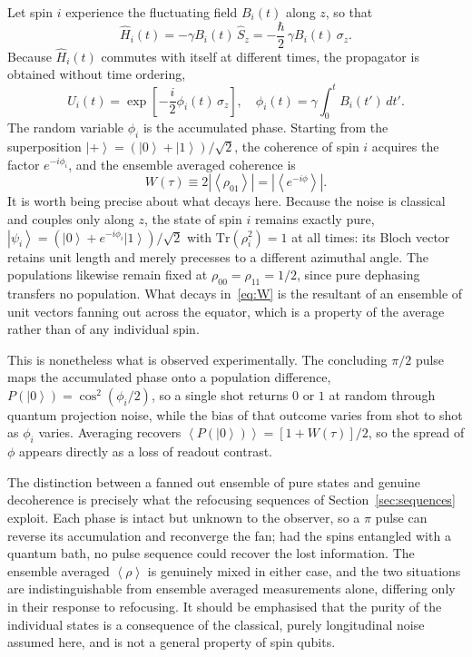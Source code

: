 \documentclass[10pt,twocolumn,a4paper]{article}
\newcommand{\ket}[1]{\left|#1\right\rangle}
\newcommand{\avg}[1]{\left\langle#1\right\rangle}
\begin{document}
Let spin $i$ experience the fluctuating field $B_i(t)$ along $z$, so that
\begin{equation}
\hat{H}_i(t) = -\gamma B_i(t)\,\hat{S}_z
= -\frac{\hbar}{2}\,\gamma B_i(t)\,\sigma_z .
\end{equation}
Because $\hat{H}_i(t)$ commutes with itself at different times, the propagator is
obtained without time ordering,
\begin{equation}
\hat{U}_i(t) = \exp\left[-\frac{i}{2}\phi_i(t)\,\sigma_z\right], \quad
\phi_i(t) = \gamma\!\int_0^t\! B_i(t')\,dt' .
\label{eq:phase}
\end{equation}
The random variable $\phi_i$ is the accumulated phase. Starting from the
superposition $\ket{+}=(\ket{0}+\ket{1})/\sqrt{2}$, the coherence of spin $i$
acquires the factor $e^{-i\phi_i}$, and the ensemble averaged coherence is
\begin{equation}
W(\tau) \equiv 2\left|\avg{\rho_{01}}\right| = \left|\avg{e^{-i\phi}}\right| .
\label{eq:W}
\end{equation}
It is worth being precise about what decays here. Because the noise is classical
and couples only along $z$, the state of spin $i$ remains exactly pure,
$\ket{\psi_i} = (\ket{0} + e^{-i\phi_i}\ket{1})/\sqrt{2}$ with
$\mathrm{Tr}(\rho_i^2) = 1$ at all times: its Bloch vector retains unit length and
merely precesses to a different azimuthal angle. The populations likewise remain
fixed at $\rho_{00} = \rho_{11} = 1/2$, since pure dephasing transfers no
population. What decays in~\eqref{eq:W} is the resultant of an ensemble of unit
vectors fanning out across the equator, which is a property of the average rather
than of any individual spin.

This is nonetheless what is observed experimentally. The concluding $\pi/2$ pulse
maps the accumulated phase onto a population difference,
$P(\ket{0}) = \cos^2(\phi_i/2)$, so a single shot returns $0$ or $1$ at random
through quantum projection noise, while the bias of that outcome varies from shot
to shot as $\phi_i$ varies. Averaging recovers
$\avg{P(\ket{0})} = [1 + W(\tau)]/2$, so the spread of $\phi$ appears directly as a
loss of readout contrast.

The distinction between a fanned out ensemble of pure states and genuine
decoherence is precisely what the refocusing sequences of
Section~\ref{sec:sequences} exploit. Each phase is intact but unknown to the
observer, so a $\pi$ pulse can reverse its accumulation and reconverge the fan; had
the spins entangled with a quantum bath, no pulse sequence could recover the lost
information. The ensemble averaged $\avg{\rho}$ is genuinely mixed in either case,
and the two situations are indistinguishable from ensemble averaged measurements
alone, differing only in their response to refocusing. It should be emphasised that
the purity of the individual states is a consequence of the classical, purely
longitudinal noise assumed here, and is not a general property of spin qubits.
\end{document}
